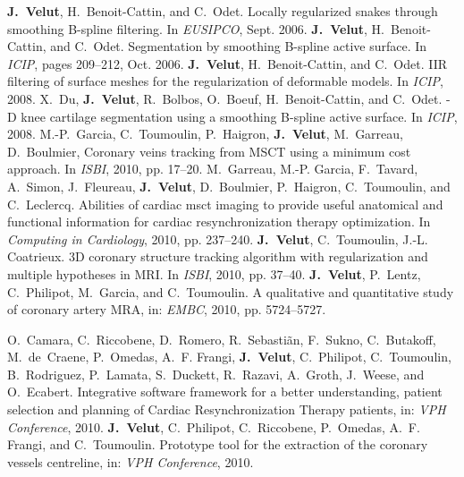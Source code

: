 \begin{thebibliography}{6}
\setlength{\itemsep}{\myitemsep}
%
\textbf{J.~Velut}, H.~Benoit-Cattin, and C.~Odet.
\newblock Locally regularized snakes through smoothing B-spline 
filtering.
\newblock In {\em EUSIPCO}, Sept. 2006.
%
\textbf{J.~Velut}, H.~Benoit-Cattin, and C.~Odet.
\newblock Segmentation by smoothing B-spline active surface.
\newblock In {\em ICIP},
pages 209--212, Oct. 2006.
%
\textbf{J.~Velut}, H.~Benoit-Cattin, and C.~Odet.
\newblock IIR filtering of surface meshes for the regularization of 
deformable models.
\newblock In {\em ICIP}, 2008.
%
X.~Du, \textbf{J.~Velut}, R.~Bolbos, O.~Boeuf, H.~Benoit-Cattin, and C.~Odet.
-D knee cartilage segmentation using a smoothing B-spline
active surface.
\newblock In {\em ICIP}, 2008.
%
M.-P.~Garcia, C.~Toumoulin, P.~Haigron, \textbf{J.~Velut}, M.~Garreau,
D.~Boulmier,
Coronary veins tracking from MSCT using a minimum cost approach.
\newblock In {\em ISBI}, 2010, pp. 17--20.
%
M.~Garreau, M.-P. Garcia, F.~Tavard, A.~Simon, J.~Fleureau, \textbf{J.~Velut},
D.~Boulmier, P.~Haigron, C.~Toumoulin, and C.~Leclercq. 
\newblock Abilities of cardiac msct imaging to provide useful anatomical and
functional information for cardiac resynchronization therapy optimization.
\newblock In {\em Computing in Cardiology}, 2010, pp. 237--240.
%
\textbf{J.~Velut}, C.~Toumoulin, J.-L. Coatrieux.
\newblock 3D coronary structure tracking algorithm with regularization and
multiple hypotheses in MRI.
\newblock In {\em ISBI}, 2010, pp. 37--40.
%
\textbf{J.~Velut}, P.~Lentz, C.~Philipot, M.~Garcia, and C.~Toumoulin.
\newblock A qualitative and quantitative study of coronary artery MRA, 
\newblock in: \emph{EMBC}, 2010, pp. 5724--5727.
\end{thebibliography}
%
\renewcommand{\refname}{\normalsize{Conf\'erences internationales}}
\vspace{-10pt}
\begin{thebibliography}{2}
\setlength{\itemsep}{\myitemsep}
%
O.~Camara, C.~Riccobene, D.~Romero, R.~Sebasti\~an, F.~Sukno, C.~Butakoff,
  M.~de~Craene, P.~Omedas, A.~F. Frangi, \textbf{J.~Velut}, C.~Philipot,
C.~Toumoulin,
  B.~Rodriguez, P.~Lamata, S.~Duckett, R.~Razavi, A.~Groth, J.~Weese, and
  O.~Ecabert.
\newblock Integrative software framework for a better understanding,
  patient selection and planning of Cardiac Resynchronization Therapy patients,
\newblock in: \emph{VPH Conference}, 2010.
\textbf{J.~Velut}, C.~Philipot, C.~Riccobene, P.~Omedas, A.~F. Frangi, and
C.~Toumoulin.
\newblock  Prototype tool for the extraction of the coronary vessels centreline,
\newblock in: \emph{VPH Conference}, 2010.
\end{thebibliography}
